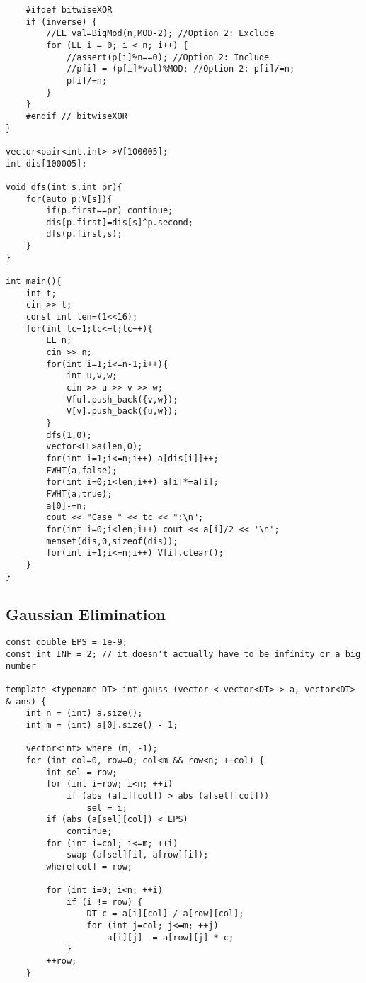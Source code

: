 \documentclass[10pt,a4paper,onesided]{article}
\begin{document}
\begin{multicols*}{3}
\begin{lstlisting}
    #ifdef bitwiseXOR
    if (inverse) {
        //LL val=BigMod(n,MOD-2); //Option 2: Exclude
        for (LL i = 0; i < n; i++) {
            //assert(p[i]%n==0); //Option 2: Include
            //p[i] = (p[i]*val)%MOD; //Option 2: p[i]/=n;
            p[i]/=n;
        }
    }
    #endif // bitwiseXOR
}

vector<pair<int,int> >V[100005];
int dis[100005];

void dfs(int s,int pr){
    for(auto p:V[s]){
        if(p.first==pr) continue;
        dis[p.first]=dis[s]^p.second;
        dfs(p.first,s);
    }
}

int main(){
    int t;
    cin >> t;
    const int len=(1<<16);
    for(int tc=1;tc<=t;tc++){
        LL n;
        cin >> n;
        for(int i=1;i<=n-1;i++){
            int u,v,w;
            cin >> u >> v >> w;
            V[u].push_back({v,w});
            V[v].push_back({u,w});
        }
        dfs(1,0);
        vector<LL>a(len,0);
        for(int i=1;i<=n;i++) a[dis[i]]++;
        FWHT(a,false);
        for(int i=0;i<len;i++) a[i]*=a[i];
        FWHT(a,true);
        a[0]-=n;
        cout << "Case " << tc << ":\n";
        for(int i=0;i<len;i++) cout << a[i]/2 << '\n';
        memset(dis,0,sizeof(dis));
        for(int i=1;i<=n;i++) V[i].clear();
    }
}
\end{lstlisting}
\subsection{Gaussian Elimination}
\begin{lstlisting}
const double EPS = 1e-9;
const int INF = 2; // it doesn't actually have to be infinity or a big number

template <typename DT> int gauss (vector < vector<DT> > a, vector<DT> & ans) {
    int n = (int) a.size();
    int m = (int) a[0].size() - 1;

    vector<int> where (m, -1);
    for (int col=0, row=0; col<m && row<n; ++col) {
        int sel = row;
        for (int i=row; i<n; ++i)
            if (abs (a[i][col]) > abs (a[sel][col]))
                sel = i;
        if (abs (a[sel][col]) < EPS)
            continue;
        for (int i=col; i<=m; ++i)
            swap (a[sel][i], a[row][i]);
        where[col] = row;

        for (int i=0; i<n; ++i)
            if (i != row) {
                DT c = a[i][col] / a[row][col];
                for (int j=col; j<=m; ++j)
                    a[i][j] -= a[row][j] * c;
            }
        ++row;
    }


\end{lstlisting}
\end{multicols*}
\end{document}

